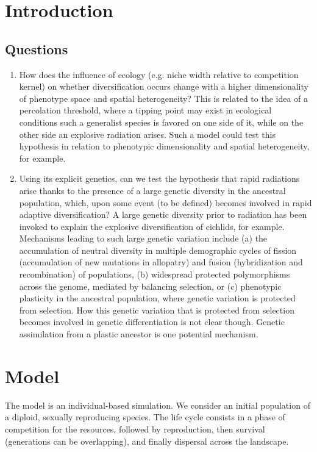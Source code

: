 \documentclass[]{article}
\begin{document}
\section*{Introduction}

\subsection*{Questions}

\begin{enumerate}
	\item How does the influence of ecology (e.g. niche width relative to competition kernel) on whether diversification occurs change with a higher dimensionality of phenotype space and spatial heterogeneity? This is related to the idea of a percolation threshold, where a tipping point may exist in ecological conditions such a generalist species is favored on one side of it, while on the other side an explosive radiation arises. Such a model could test this hypothesis in relation to phenotypic dimensionality and spatial heterogeneity, for example.
	\item Using its explicit genetics, can we test the hypothesis that rapid radiations arise thanks to the presence of a large genetic diversity in the ancestral population, which, upon some event (to be defined) becomes involved in rapid adaptive diversification? A large genetic diversity prior to radiation has been invoked to explain the explosive diversification of cichlids, for example. Mechanisms leading to such large genetic variation include (a) the accumulation of neutral diversity in multiple demographic cycles of fission (accumulation of new mutations in allopatry) and fusion (hybridization and recombination) of populations, (b) widespread protected polymorphisms across the genome, mediated by balancing selection, or (c) phenotypic plasticity in the ancestral population, where genetic variation is protected from selection. How this genetic variation that is protected from selection becomes involved in genetic differentiation is not clear though. Genetic assimilation from a plastic ancestor is one potential mechanism.	 
\end{enumerate}

\section*{Model}

The model is an individual-based simulation. We consider an initial population of a diploid, sexually reproducing species. The life cycle consists in a phase of competition for the resources, followed by reproduction, then survival (generations can be overlapping), and finally dispersal across the landscape.\\
\end{document}
